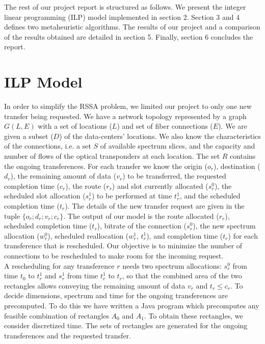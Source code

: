 \documentclass[11pt,a4paper]{article}
\begin{document}
The rest of our project report is structured as follows. We present the integer linear programming (ILP) model implemented in section 2. Section 3 and 4 defines two metaheuristic algorithms. The results of our project and a comparison of the results obtained are detailed in section 5. Finally, section 6 concludes the report.

\section{ILP Model}

In order to simplify the RSSA problem, we limited our project to only one new transfer being requested. We have a network topology represented by a graph $G(L,E)$ with a set of locations ($L$) and set of fiber connections ($E$). We are given a subset ($D$) of the data-centers' locations. We also know the characteristics of the connections, i.e. a set $S$ of available spectrum slices, and the capacity and number of flows of the optical transponders at each location. The set $R$ contains the ongoing transferences. For each transfer we know the origin ($o_{r}$), destination ($d_{r}$), the remaining amount of data ($v_{r}$) to be transferred, the requested completion time ($c_{r}$), the route ($r_{r}$) and slot currently allocated ($s^{0}_{r}$), the scheduled slot allocation ($s^{1}_{r}$) to be performed at time $t^{1}_{r}$, and the scheduled completion time ($t_{r}$). The details of the new transfer request are given in the tuple $\{o_{r}; d_{r}; v_{r}; c_{r}\}$. The output of our model is the route allocated ($r_{r}$), scheduled completion time ($t_{r}$), bitrate of the connection ($s^{0}_{r}$), the new spectrum allocation ($w^{0}_{r}$), scheduled reallocation ($w^{1}_{r}$, $t^{1}_{r}$), and completion time ($t_{r}$) for each transference that is rescheduled. Our objective is to minimize the number of connections to be rescheduled to make room for the incoming request.\\

A rescheduling for any transference $r$ needs two spectrum allocations: $s^{0}_{r}$ from time $t_{0}$ to $t^{1}_{r}$ and $s^{1}_{r}$ from time $t^{1}_{r}$ to $t_{r}$, so that the combined area of the two rectangles allows conveying the remaining amount of data $v_{r}$ and $t_{r} \leq  c_{r}$. To decide dimensions, spectrum and time for the ongoing transferences are precomputed. To do this we have written a Java program which precomputes any feasible combination of rectangles $A_{0}$ and $A_{1}$. To obtain these rectangles, we consider discretized time. The sets of rectangles are generated for the ongoing transferences and the requested transfer.\\\\
\end{document}
